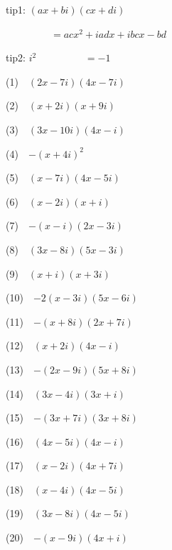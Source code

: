 \documentclass[a4j,twocolumn,10pt,fleqn]{jarticle}
\begin{document}
tip1: $\left(a x + b i\right) \left(c x + d i\right)$

~~~~~~~~~$=a c x^{2} + i a d x + i b c x - b d$


tip2: $i^{2}$
~~~~~~~~~$=-1$


(1)~~$\left(2 x - 7 i\right) \left(4 x - 7 i\right)$

(2)~~$\left(x + 2 i\right) \left(x + 9 i\right)$

(3)~~$\left(3 x - 10 i\right) \left(4 x - i\right)$

(4)~~$-\left(x + 4 i\right)^{2}$

(5)~~$\left(x - 7 i\right) \left(4 x - 5 i\right)$

(6)~~$\left(x - 2 i\right) \left(x + i\right)$

(7)~~$-\left(x - i\right) \left(2 x - 3 i\right)$

(8)~~$\left(3 x - 8 i\right) \left(5 x - 3 i\right)$

(9)~~$\left(x + i\right) \left(x + 3 i\right)$

(10)~~$-2\left(x - 3 i\right) \left(5 x - 6 i\right)$

(11)~~$-\left(x + 8 i\right) \left(2 x + 7 i\right)$

(12)~~$\left(x + 2 i\right) \left(4 x - i\right)$

(13)~~$-\left(2 x - 9 i\right) \left(5 x + 8 i\right)$

(14)~~$\left(3 x - 4 i\right) \left(3 x + i\right)$

(15)~~$-\left(3 x + 7 i\right) \left(3 x + 8 i\right)$

(16)~~$\left(4 x - 5 i\right) \left(4 x - i\right)$

(17)~~$\left(x - 2 i\right) \left(4 x + 7 i\right)$

(18)~~$\left(x - 4 i\right) \left(4 x - 5 i\right)$

(19)~~$\left(3 x - 8 i\right) \left(4 x - 5 i\right)$

(20)~~$-\left(x - 9 i\right) \left(4 x + i\right)$
\end{document}

